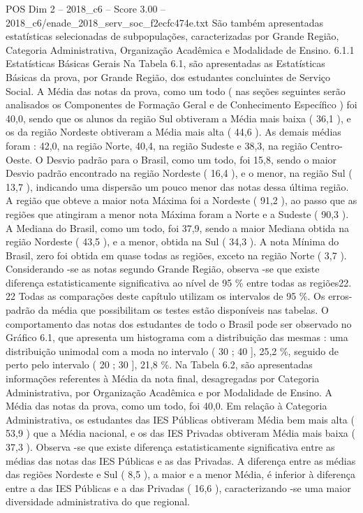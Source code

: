 \begin{textsample}{POS Dim 2 – 2018\_c6 – Score 3.00 – 2018\_c6/enade\_2018\_serv\_soc\_f2ecfc474e.txt}
São também apresentadas estatísticas selecionadas de subpopulações, caracterizadas por Grande Região, Categoria Administrativa, Organização Acadêmica e Modalidade de Ensino. 6.1.1 Estatísticas Básicas Gerais Na Tabela 6.1, são apresentadas as Estatísticas Básicas da prova, por Grande Região, dos estudantes concluintes de Serviço Social.
A Média das notas da prova, como um todo ( nas seções seguintes serão analisados os Componentes de Formação Geral e de Conhecimento Específico ) foi 40,0, sendo que os alunos da região Sul obtiveram a Média mais baixa ( 36,1 ), e os da região Nordeste obtiveram a Média mais alta ( 44,6 ).
As demais médias foram : 42,0, na região Norte, 40,4, na região Sudeste e 38,3, na região Centro-Oeste.
O Desvio padrão para o Brasil, como um todo, foi 15,8, sendo o maior Desvio padrão encontrado na região Nordeste ( 16,4 ), e o menor, na região Sul ( 13,7 ), indicando uma dispersão um pouco menor das notas dessa última região.
A região que obteve a maior nota Máxima foi a Nordeste ( 91,2 ), ao passo que as regiões que atingiram a menor nota Máxima foram a Norte e a Sudeste ( 90,3 ).
A Mediana do Brasil, como um todo, foi 37,9, sendo a maior Mediana obtida na região Nordeste ( 43,5 ), e a menor, obtida na Sul ( 34,3 ).
A nota Mínima do Brasil, zero foi obtida em quase todas as regiões, exceto na região Norte ( 3,7 ).
Considerando -se as notas segundo Grande Região, observa -se que existe diferença estatisticamente significativa ao nível de 95 \% entre todas as regiões22. 22 Todas as comparações deste capítulo utilizam os intervalos de 95 \%.
Os erros-padrão da média que possibilitam os testes estão disponíveis nas tabelas.
O comportamento das notas dos estudantes de todo o Brasil pode ser observado no Gráfico 6.1, que apresenta um histograma com a distribuição das mesmas : uma distribuição unimodal com a moda no intervalo ( 30 ; 40 ], 25,2 \%, seguido de perto pelo intervalo ( 20 ; 30 ], 21,8 \%.
Na Tabela 6.2, são apresentadas informações referentes à Média da nota final, desagregadas por Categoria Administrativa, por Organização Acadêmica e por Modalidade de Ensino.
A Média das notas da prova, como um todo, foi 40,0.
Em relação à Categoria Administrativa, os estudantes das IES Públicas obtiveram Média bem mais alta ( 53,9 ) que a Média nacional, e os das IES Privadas obtiveram Média mais baixa ( 37,3 ).
Observa -se que existe diferença estatisticamente significativa entre as médias das notas das IES Públicas e as das Privadas.
A diferença entre as médias das regiões Nordeste e Sul ( 8,5 ), a maior e a menor Média, é inferior à diferença entre a das IES Públicas e a das Privadas ( 16,6 ), caracterizando -se uma maior diversidade administrativa do que regional.

\end{textsample}
